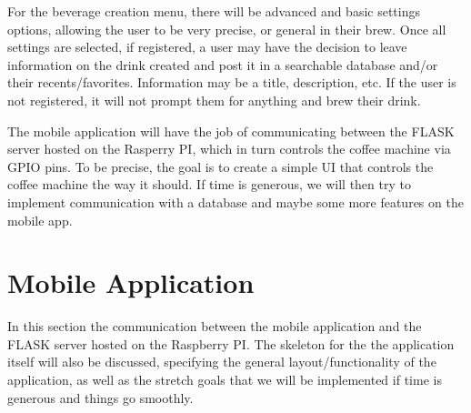 \documentclass[conference]{IEEEtran}
\begin{document}
For the beverage creation menu, there will be advanced and basic settings options, allowing the user to be very
precise, or general in their brew. Once all settings are selected, if
registered, a user may have the decision to leave information on the drink
created and post it in a searchable database and/or their recents/favorites.
Information may be a title, description, etc. If the user is not registered, it
will not prompt them for anything and brew their drink. 

The mobile application
will have the job of communicating between the FLASK server hosted on the 
Rasperry PI, which in turn controls the coffee machine via GPIO pins. To be
precise, the goal is to create a simple UI that controls the coffee machine the way it should.
If time is generous, we will then try to implement communication with a database and
maybe some more features on the mobile app.


\section{Mobile Application}
In this section the communication between the mobile application and the FLASK
server hosted on the Raspberry PI. The skeleton for the the application itself will
also be discussed, specifying the general layout/functionality of the application, as
well as the stretch goals that we will be implemented if time is generous and things
go smoothly.
\end{document}
